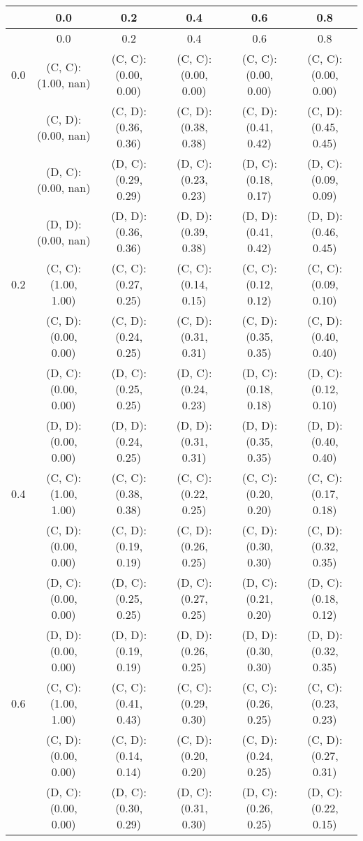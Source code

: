 \begin{tabular}{c | c c c c c}
& 0.0 & 0.2 & 0.4 & 0.6 & 0.8 \\
\hline
& 0.0 & 0.2 & 0.4 & 0.6 & 0.8 \\
\hline
0.0 & (C, C): (1.00, nan) & (C, C): (0.00, 0.00) & (C, C): (0.00, 0.00) & (C, C): (0.00, 0.00) & (C, C): (0.00, 0.00) \\
 & (C, D): (0.00, nan) & (C, D): (0.36, 0.36) & (C, D): (0.38, 0.38) & (C, D): (0.41, 0.42) & (C, D): (0.45, 0.45) \\
 & (D, C): (0.00, nan) & (D, C): (0.29, 0.29) & (D, C): (0.23, 0.23) & (D, C): (0.18, 0.17) & (D, C): (0.09, 0.09) \\
 & (D, D): (0.00, nan) & (D, D): (0.36, 0.36) & (D, D): (0.39, 0.38) & (D, D): (0.41, 0.42) & (D, D): (0.46, 0.45) \\
\hline
0.2 & (C, C): (1.00, 1.00) & (C, C): (0.27, 0.25) & (C, C): (0.14, 0.15) & (C, C): (0.12, 0.12) & (C, C): (0.09, 0.10) \\
 & (C, D): (0.00, 0.00) & (C, D): (0.24, 0.25) & (C, D): (0.31, 0.31) & (C, D): (0.35, 0.35) & (C, D): (0.40, 0.40) \\
 & (D, C): (0.00, 0.00) & (D, C): (0.25, 0.25) & (D, C): (0.24, 0.23) & (D, C): (0.18, 0.18) & (D, C): (0.12, 0.10) \\
 & (D, D): (0.00, 0.00) & (D, D): (0.24, 0.25) & (D, D): (0.31, 0.31) & (D, D): (0.35, 0.35) & (D, D): (0.40, 0.40) \\
\hline
0.4 & (C, C): (1.00, 1.00) & (C, C): (0.38, 0.38) & (C, C): (0.22, 0.25) & (C, C): (0.20, 0.20) & (C, C): (0.17, 0.18) \\
 & (C, D): (0.00, 0.00) & (C, D): (0.19, 0.19) & (C, D): (0.26, 0.25) & (C, D): (0.30, 0.30) & (C, D): (0.32, 0.35) \\
 & (D, C): (0.00, 0.00) & (D, C): (0.25, 0.25) & (D, C): (0.27, 0.25) & (D, C): (0.21, 0.20) & (D, C): (0.18, 0.12) \\
 & (D, D): (0.00, 0.00) & (D, D): (0.19, 0.19) & (D, D): (0.26, 0.25) & (D, D): (0.30, 0.30) & (D, D): (0.32, 0.35) \\
\hline
0.6 & (C, C): (1.00, 1.00) & (C, C): (0.41, 0.43) & (C, C): (0.29, 0.30) & (C, C): (0.26, 0.25) & (C, C): (0.23, 0.23) \\
 & (C, D): (0.00, 0.00) & (C, D): (0.14, 0.14) & (C, D): (0.20, 0.20) & (C, D): (0.24, 0.25) & (C, D): (0.27, 0.31) \\
 & (D, C): (0.00, 0.00) & (D, C): (0.30, 0.29) & (D, C): (0.31, 0.30) & (D, C): (0.26, 0.25) & (D, C): (0.22, 0.15) \\

\end{tabular}
